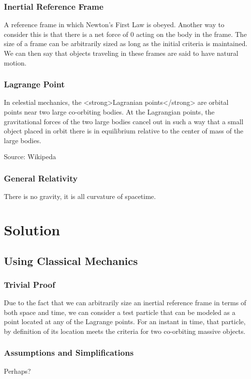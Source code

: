 \documentclass[]{report}
\begin{document}
      \subsection{Inertial Reference Frame}
        A reference frame in which Newton's First Law is obeyed. Another way to consider this is that there is a net force of 0 acting on the body in the frame. The size of a frame can be arbitrarily sized as long as the initial criteria is maintained. We can then say that objects traveling in these frames are said to have natural motion.

      \subsection{Lagrange Point}
        In celestial mechanics, the <strong>Lagranian points</strong> are orbital points near two large co-orbiting bodies. At the Lagrangian points, the gravitational forces of the two large bodies cancel out in such a way that a small object placed in orbit there is in equilibrium relative to the center of mass of the large bodies.

        Source: Wikipeda

      \subsection{General Relativity}
        There is no gravity, it is all curvature of spacetime.

  \chapter{Solution}

    \section{Using Classical Mechanics}

      \subsection{Trivial Proof}
        Due to the fact that we can arbitrarily size an inertial reference frame in terms of both space and time, we can consider a test particle that can be modeled as a point located at any of the Lagrange points. For an instant in time, that particle, by definition of its location meets the criteria for two co-orbiting massive objects.

      \subsection{Assumptions and Simplifications}
        Perhaps?
\end{document}
